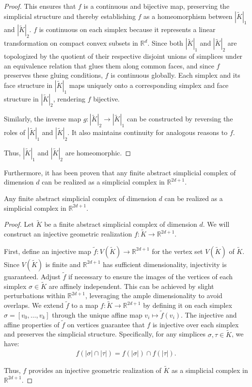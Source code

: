 \begin{proof}
	This ensures that $f$ is a continuous and bijective map, preserving
	the simplicial structure and thereby establishing $f$ as a homeomorphism between
	$|\tilde{K}|_{1}$ and $|\tilde{K}|_{2}$. $f$ is continuous on each simplex because it represents a linear transformation
	on compact convex subsets in $\mathbb{R}^{d}$. Since both $|\tilde{K}|_{1}$
	and $|\tilde{K}|_{2}$ are topologized by the quotient of their respective
	disjoint unions of simplices under an equivalence relation that glues them
	along common faces, and since $f$ preserves these gluing conditions, $f$ is
	continuous globally. Each simplex and its face structure in $|\tilde{K}|_{1}$ maps
	uniquely onto a corresponding simplex and face structure in $|\tilde{K}|_{2}$,
	rendering $f$ bijective.

	Similarly, the inverse map $g: |\tilde{K}|_{2} \to |\tilde{K}|_{1}$ can be constructed
	by reversing the roles of $|\tilde{K}|_{1}$ and $|\tilde{K}|_{2}$. It also
	maintains continuity for analogous reasons to $f$.

	Thus, $|\tilde{K}|_{1}$ and $|\tilde{K}|_{2}$ are homeomorphic.
\end{proof}

Furthermore, it has been proven that any finite abstract simplicial complex of dimension
$d$ can be realized as a simplicial complex in $\mathbb{R}^{2d+1}$.

\begin{theorem}
	Any finite abstract simplicial complex of dimension $d$ can be realized as a simplicial
	complex in $\mathbb{R}^{2d+1}$.
\end{theorem}

\begin{proof}
	Let $\tilde{K}$ be a finite abstract simplicial complex of dimension $d$. We
	will construct an injective geometric realization
	$f: \tilde{K}\to \mathbb{R}^{2d+1}$.

	First, define an injective map $\tilde{f}: V(\tilde{K}) \to \mathbb{R}^{2d+1}$
	for the vertex set $V(\tilde{K})$ of $\tilde{K}$. Since $V(\tilde{K})$ is
	finite and $\mathbb{R}^{2d+1}$ has sufficient dimensionality, injectivity is guaranteed.
	Adjust $\tilde{f}$ if necessary to ensure the images of the vertices of each
	simplex $\sigma \in \tilde{K}$ are affinely independent. This can be achieved by
	slight perturbations within $\mathbb{R}^{2d+1}$, leveraging the ample
	dimensionality to avoid overlaps. We extend $\tilde{f}$ to a map $f: \tilde{K}\to \mathbb{R}^{2d+1}$ by defining
	it on each simplex $\sigma = [v_{0}, \ldots, v_{k}]$ through the unique affine
	map $v_{i} \mapsto \tilde{f}(v_{i})$. The injective and affine properties of $\tilde
	{f}$ on vertices guarantee that $f$ is injective over each simplex and preserves
	the simplicial structure. Specifically, for any simplices $\sigma, \tau \in \tilde
	{K}$, we have:
	\begin{align}
		f(|\sigma| \cap |\tau|) = f(|\sigma|) \cap f(|\tau|).
	\end{align}

	Thus, $f$ provides an injective geometric realization of $\tilde{K}$ as a simplicial
	complex in $\mathbb{R}^{2d+1}$.
\end{proof}

